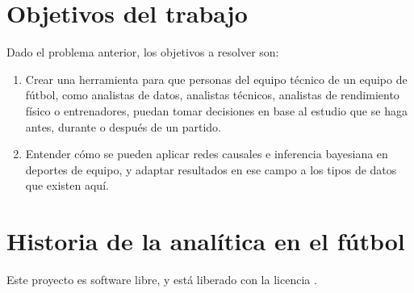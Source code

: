 \section{Objetivos del trabajo} \label{sect:goals}

Dado el problema anterior, los objetivos a resolver son:

\begin{enumerate}
    \item \label{obj:1} Crear una herramienta para que personas del equipo técnico de
    un equipo de fútbol, como analistas de datos, analistas técnicos, analistas de rendimiento 
    físico o entrenadores, puedan tomar decisiones en base al estudio que se haga antes, durante 
    o después de un partido. 
    \item \label{obj:2} Entender cómo se pueden aplicar redes causales e inferencia 
    bayesiana en deportes de equipo, y adaptar resultados en ese campo a 
    los tipos de datos que existen aquí.
\end{enumerate}

\section{Historia de la analítica en el fútbol}


Este proyecto es software libre, y está liberado con la licencia \cite{gplv3}.
